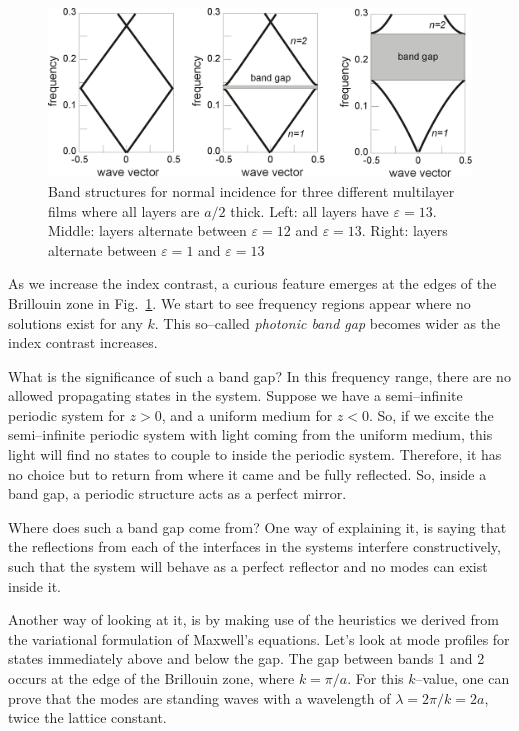 \begin{figure}
\centering
\includegraphics[width=12cm]{periodic/figures/1D_bands}
\caption{Band structures for normal incidence for three different multilayer films where all layers are $a/2$ thick. Left: all layers have $\varepsilon=13$. Middle: layers alternate between $\varepsilon=12$ and $\varepsilon=13$. Right: layers alternate between $\varepsilon=1$ and $\varepsilon=13$}
\label{fig-1d-bands}
\end{figure}

As we increase the index contrast, a curious feature emerges at the edges of the Brillouin zone in Fig.~\ref{fig-1d-bands}. We start to see frequency regions appear where no solutions exist for any $k$. This so--called \emph{photonic band gap} becomes wider as the index contrast increases.

What is the significance of such a band gap? In this frequency range, there are no allowed propagating states in the system. Suppose we have a semi--infinite periodic system for $z>0$, and a uniform medium for $z<0$. So, if we excite the semi--infinite periodic system with light coming from the uniform medium, this light will find no states to couple to inside the periodic system. Therefore, it has no choice but to return from where it came and be fully reflected. So, inside a band gap, a periodic structure acts as a perfect mirror.

Where does such a band gap come from? One way of explaining it, is saying that the reflections from each of the interfaces in the systems interfere constructively, such that the system will behave as a perfect reflector and no modes can exist inside it.

Another way of looking at it, is by making use of the heuristics we derived from the variational formulation of Maxwell's equations. Let's look at mode profiles for states immediately above and below the gap. The gap between bands 1 and 2 occurs at the edge of the Brillouin zone, where $k = \pi / a$. For this $k$--value, one can prove that the modes are standing waves with a wavelength of $\lambda = 2 \pi / k = 2a$, twice the lattice constant.

